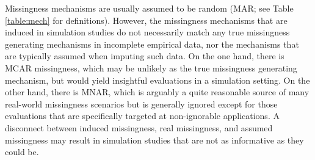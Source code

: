 \documentclass[bimj,fleqn]{w-art}
\begin{document}

Missingness mechanisms are usually assumed to be random (MAR; see Table \ref{table:mech} for definitions). However, the missingness mechanisms that are induced in simulation studies do not necessarily match any true missingness generating mechanisms in incomplete empirical data, nor the mechanisms that are typically assumed when imputing such data. On the one hand, there is MCAR missingness, which may be unlikely as the true missingness generating mechanism, but would yield insightful evaluations in a simulation setting. On the other hand, there is MNAR, which is arguably a quite reasonable source of many real-world missingness scenarios but is generally ignored except for those evaluations that are specifically targeted at non-ignorable applications. A disconnect between induced missingness, real missingness, and assumed missingness may result in simulation studies that are not as informative as they could be. 

\end{document}
